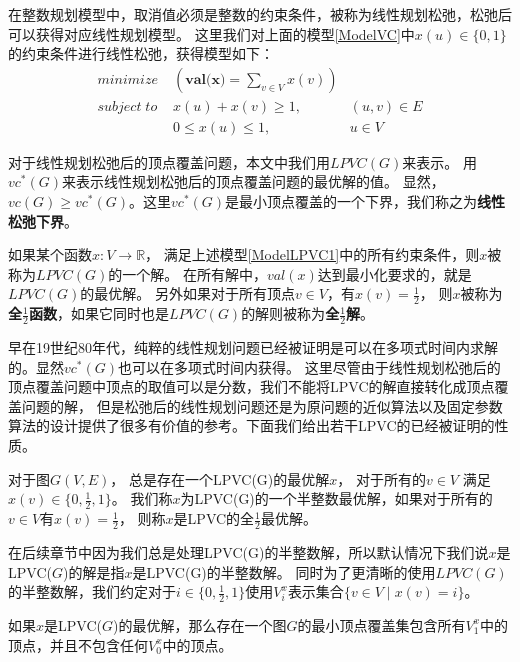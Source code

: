 在整数规划模型中，取消值必须是整数的约束条件，被称为线性规划松弛，松弛后可以获得对应线性规划模型。
这里我们对上面的模型\ref{ModelVC}中$x(u) \in \{0, 1\}$的约束条件进行线性松弛，获得模型如下：
\begin{equation} \label{ModelLPVC1} \begin{aligned}
  minimize\; & (\textbf{val(x)} = \sum_{v \in V}{x(v)}) &\\
  subject\; to\; & x(u) + x(v) \ge 1, &(u, v) \in E \\
   & 0 \le x(u) \le 1, & u \in V
\end{aligned} \end{equation}

对于线性规划松弛后的顶点覆盖问题，本文中我们用$LPVC(G)$来表示。
用$vc^{*}(G)$来表示线性规划松弛后的顶点覆盖问题的最优解的值。
显然，$vc(G) \ge vc^*(G)$。这里$vc^{*}(G)$是最小顶点覆盖的一个下界，我们称之为\textbf{线性松弛下界}。

如果某个函数$x:V \rightarrow \mathbb{R}$， 满足上述模型\ref{ModelLPVC1}中的所有约束条件，则$x$被称为$LPVC(G)$的一个解。
在所有解中，$val(x)$达到最小化要求的，就是$LPVC(G)$的最优解。
另外如果对于所有顶点$v \in V$，有$x(v) = \frac{1}{2}$，
则$x$被称为\textbf{全$\frac{1}{2}$函数}，如果它同时也是$LPVC(G)$的解则被称为\textbf{全$\frac{1}{2}$解}。



早在19世纪80年代，纯粹的线性规划问题已经被证明是可以在多项式时间内求解的\cite{khachiian1979polynomial}。显然$vc^{*}(G)$也可以在多项式时间内获得。
这里尽管由于线性规划松弛后的顶点覆盖问题中顶点的取值可以是分数，我们不能将LPVC的解直接转化成顶点覆盖问题的解，
但是松弛后的线性规划问题还是为原问题的近似算法以及固定参数算法的设计提供了很多有价值的参考。下面我们给出若干LPVC的已经被证明的性质。
\begin{lemma}
对于图$G(V, E)$， 总是存在一个LPVC(G)的最优解$x$， 对于所有的$v \in V$ 满足$x(v) \in \{0, \frac{1}{2}, 1\}$。
我们称$x$为LPVC(G)的一个半整数最优解，如果对于所有的$v \in V$有$x(v) = \frac{1}{2}$， 则称$x$是LPVC的全$\frac{1}{2}$最优解。
\end{lemma}

在后续章节中因为我们总是处理LPVC(G)的半整数解，所以默认情况下我们说$x$是LPVC($G$)的解是指$x$是LPVC(G)的半整数解。
同时为了更清晰的使用$LPVC(G)$的半整数解，我们约定对于$i \in \{0, \frac{1}{2}, 1\}$使用$V^x_i$表示集合$\{v \in V\;|\; x(v) = i\}$。

\begin{lemma}\label{relationBwtVCAndLPVC}
如果$x$是LPVC($G$)的最优解，那么存在一个图$G$的最小顶点覆盖集包含所有$V^x_1$中的顶点，并且不包含任何$V^x_0$中的顶点。
\end{lemma}

